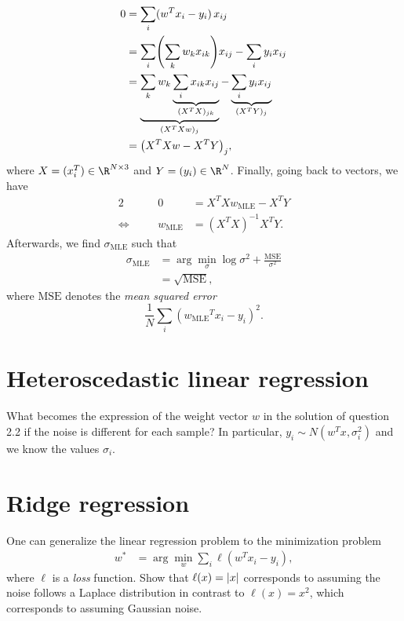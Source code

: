 \documentclass[11pt, a4paper]{article}
\begin{document}
\begin{enumerate}
\begin{solution}
        \begin{align*}
            0 & = \sum_i (w^T x_i - y_i) \, x_{ij} \\
            & = \sum_i \rbk*{\sum_k w_k x_{ik}} x_{ij} - \sum_i y_i x_{ij} \\
            & = \underbrace{\sum_k w_k \underbrace{\sum_i x_{ik} x_{ij}}_{\rbk{X^T X}_{jk}}}_{\rbk{X^T X w}_j} - \underbrace{\sum_i y_i x_{ij}}_{\rbk{X^T Y}_j} \\
            & = \rbk*{X^T X w - X^T Y}_j ,
        \end{align*}
        where $X = (x_i^T) \in \R^{N \times 3}$ and $Y = (y_i) \in \R^{N}$. Finally, going back to vectors, we have
        \begin{alignat*}{2}
            && 0 & = X^T X w_{\text{MLE}} - X^T Y \\
            \Leftrightarrow \quad && w_{\text{MLE}} & = (X^T X)^{-1} X^T Y .
        \end{alignat*}
        Afterwards, we find $\sigma_{\text{MLE}}$ such that
        \begin{align*}
            \sigma_{\text{MLE}} & = \arg \min_\sigma \log \sigma^2 + \frac{\text{MSE}}{\sigma^2} \\
            & = \sqrt{\text{MSE}},
        \end{align*}
        where $\text{MSE}$ denotes the \emph{mean squared error}
        \begin{equation*}
            \frac{1}{N} \sum_i ({w_{\text{MLE}}}^T x_i - y_i)^2 .
        \end{equation*}
    \end{solution}
\end{enumerate}

\newpage

\section{Heteroscedastic linear regression}

What becomes the expression of the weight vector $w$ in the solution of question 2.2 if the noise is different for each sample? In
particular, $y_i \sim N(w^T x, \sigma_i^2)$ and we know the values $\sigma_i$.

\newpage

\section{Ridge regression}

One can generalize the linear regression problem to the minimization problem
\begin{align*}
    w^* & = \arg \min_w \sum_i \ell(w^T x_i - y_i) ,
\end{align*}
where $\ell$ is a \emph{loss} function. Show that $\ell(x) = \lvert x\rvert$ corresponds to assuming the noise follows a Laplace distribution in contrast to $\ell(x) = x^2$, which corresponds to assuming Gaussian noise.
\end{document}
